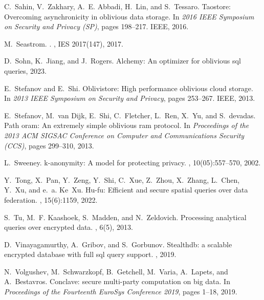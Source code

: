 \documentclass[11pt]{article}
\begin{document}
\begin{thebibliography}{140}
\begin{small}
C.~Sahin, V.~Zakhary, A.~E. Abbadi, H.~Lin, and S.~Tessaro.
\newblock Taostore: Overcoming asynchronicity in oblivious data storage.
\newblock In {\em 2016 IEEE Symposium on Security and Privacy (SP)}, pages
  198--217. IEEE, 2016.

M.~Seastrom.
.
, IES 2017(147), 2017.

D.~Sohn, K.~Jiang, and J.~Rogers.
\newblock Alchemy: An optimizer for oblivious sql queries, 2023.

E.~Stefanov and E.~Shi.
\newblock Oblivistore: High performance oblivious cloud storage.
\newblock In {\em 2013 IEEE Symposium on Security and Privacy}, pages 253--267.
  IEEE, 2013.

E.~Stefanov, M.~van Dijk, E.~Shi, C.~Fletcher, L.~Ren, X.~Yu, and S.~devadas.
\newblock Path oram: An extremely simple oblivious ram protocol.
\newblock In {\em Proceedings of the 2013 ACM SIGSAC Conference on Computer and
  Communications Security (CCS)}, pages 299--310, 2013.

L.~Sweeney.
\newblock k-anonymity: A model for protecting privacy.
, 10(05):557--570, 2002.

Y.~Tong, X.~Pan, Y.~Zeng, Y.~Shi, C.~Xue, Z.~Zhou, X.~Zhang, L.~Chen, Y.~Xu,
  and e.~a. Ke~Xu.
\newblock Hu-fu: Efficient and secure spatial queries over data federation.
, 15(6):1159, 2022.

S.~Tu, M.~F. Kaashoek, S.~Madden, and N.~Zeldovich.
\newblock Processing analytical queries over encrypted data.
, 6(5), 2013.

D.~Vinayagamurthy, A.~Gribov, and S.~Gorbunov.
\newblock Stealthdb: a scalable encrypted database with full sql query support.
, 2019.

N.~Volgushev, M.~Schwarzkopf, B.~Getchell, M.~Varia, A.~Lapets, and
  A.~Bestavros.
\newblock Conclave: secure multi-party computation on big data.
\newblock In {\em Proceedings of the Fourteenth EuroSys Conference 2019}, pages
  1--18, 2019.


\end{small}
\end{thebibliography}
\end{document}
